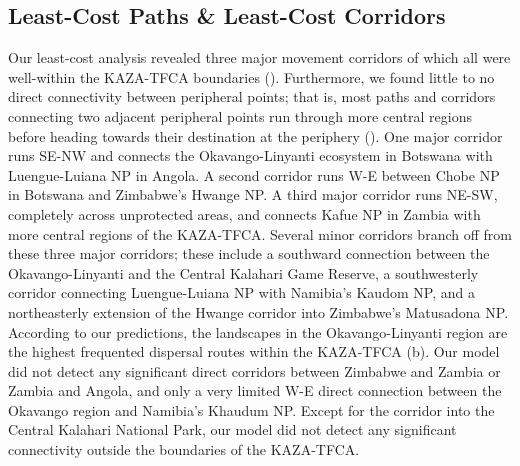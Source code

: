 \documentclass[abstract=on,10pt,a4paper,bibliography=totocnumbered]{article}
\begin{document}
\subsection{Least-Cost Paths \& Least-Cost Corridors}
Our least-cost analysis revealed three major movement corridors of which all
were well-within the KAZA-TFCA boundaries (). Furthermore, we
found little to no direct connectivity between peripheral points; that is, most
paths and corridors connecting two adjacent peripheral points run through more
central regions before heading towards their destination at the periphery
(). One major corridor runs SE-NW and connects the
Okavango-Linyanti ecosystem in Botswana with Luengue-Luiana NP in Angola. A
second corridor runs W-E between Chobe NP in Botswana and Zimbabwe's Hwange NP.
A third major corridor runs NE-SW, completely across unprotected areas, and
connects Kafue NP in Zambia with more central regions of the KAZA-TFCA. Several
minor corridors branch off from these three major corridors; these include a
southward connection between the Okavango-Linyanti and the Central Kalahari Game
Reserve, a southwesterly corridor connecting Luengue-Luiana NP with Namibia's
Kaudom NP, and a northeasterly extension of the Hwange corridor into Zimbabwe's
Matusadona NP. According to our predictions, the landscapes in the
Okavango-Linyanti region are the highest frequented dispersal routes within the
KAZA-TFCA (b). Our model did not detect any significant direct
corridors between Zimbabwe and Zambia or Zambia and Angola, and only a very
limited W-E direct connection between the Okavango region and Namibia's Khaudum
NP. Except for the corridor into the Central Kalahari National Park, our model
did not detect any significant connectivity outside the boundaries of the
KAZA-TFCA.
\end{document}
